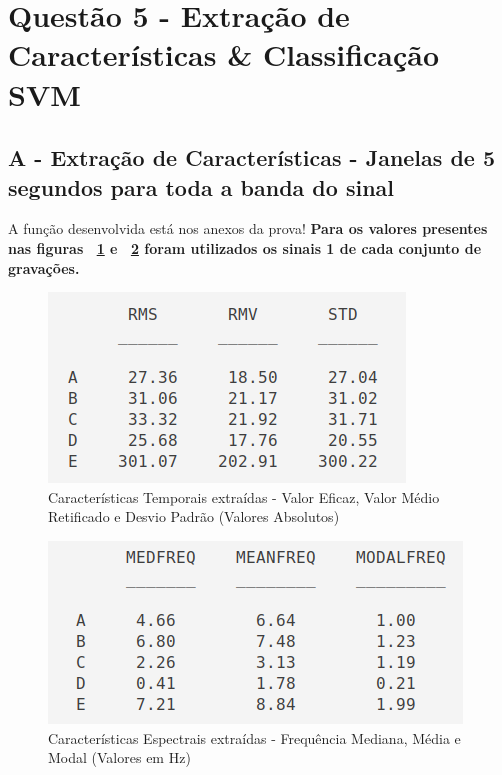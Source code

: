 \documentclass{article}
\begin{document}
\section*{Questão 5 - Extração de Características \& Classificação SVM}
\subsection*{A - Extração de Características - Janelas de 5 segundos para toda a banda do sinal}
A função desenvolvida está nos anexos da prova! \textbf{Para os valores presentes nas figuras ~\ref{fig:Q5_a-TF} e ~\ref{fig:Q5_a-FF} foram utilizados os sinais 1 de cada conjunto de gravações.}

\begin{figure}[H]
	\begin{center}
		\includegraphics[scale=0.6]{Figures/Q5_a-TF.png}
		\caption{Características Temporais extraídas - Valor Eficaz, Valor Médio Retificado e Desvio Padrão (Valores Absolutos)}
		\label{fig:Q5_a-TF}
	\end{center}
\end{figure}

\begin{figure}[H]
	\begin{center}
		\includegraphics[scale=0.55]{Figures/Q5_a-FF.png}
		\caption{Características Espectrais extraídas - Frequência Mediana, Média e Modal (Valores em Hz)}
		\label{fig:Q5_a-FF}
	\end{center}
\end{figure}
\end{document}
